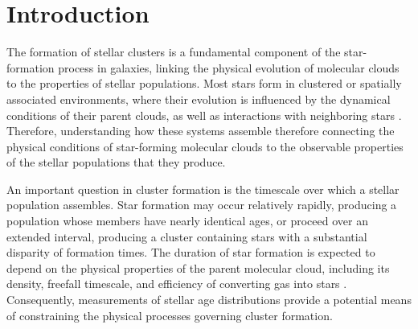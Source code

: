 \documentclass[linenumbers, twocolumn]{aastex631}
\begin{document}


\section{Introduction}
\label{sec:intro}

The formation of stellar clusters is a fundamental component of the star-formation process in galaxies, linking the physical evolution of molecular clouds to the properties of stellar populations. Most stars form in clustered or spatially associated environments, where their evolution is influenced by the dynamical conditions of their parent clouds, as well as interactions with neighboring stars \citep{LadaLada2003,Krumholz2019}. Therefore, understanding how these systems assemble therefore connecting the physical conditions of star-forming molecular clouds to the observable properties of the stellar populations that they produce.

An important question in cluster formation is the timescale over which a stellar population assembles. Star formation may occur relatively rapidly, producing a population whose members have nearly identical ages, or proceed over an extended interval, producing a cluster containing stars with a substantial disparity of formation times. The duration of star formation is expected to depend on the physical properties of the parent molecular cloud, including its density, freefall timescale, and efficiency of converting gas into stars \citep{McKeeOstriker2007,KrumholzTan2007}. Consequently, measurements of stellar age distributions provide a potential means of constraining the physical processes governing cluster formation.
\end{document}
